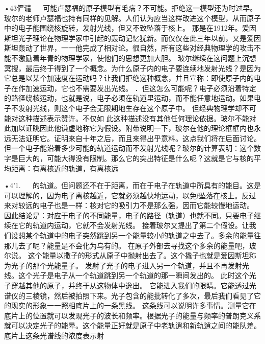 •43俨谴
  
可能卢瑟福的原子模型有毛病？不可能。拒绝这一模型还为时过早。玻尔的老师卢瑟福也持有同样的见解。人们认为应当这样改进这个模型，从而原子中的电子能围绕核旋转，发射光线，但又不致坠落于核上。
那是在1912年。爱因斯坦光子理论在物理学家中引起的轰动记忆犹新。而仅仅在此三年以前，又是爱因斯坦轰动了世界，一一他完成了相对论。很自然，所有这些对经典物理学的攻击不能不激励着年青的物理学家，使他们的思想更加大胆。
玻尔继续在这问题上沉想冥搜，最后终于得到了一个概念。为什么原子内的电子要连续地发射光线？是因为它总是以某个加速度在运动吗？让我们拒绝这种概念，并且宣称：即使原子内的电子在作加速运动，它也不需要发出光线。
．但这怎么可能呢？电子必须沿着特定的路径绕核运动，也就是说，电子必须在轨道里运动，而不能任意地运动。如果电子不发射光线，则这个电子会无限期地生存在这个原子中。
但经典物理学却不可能对这种描述表示赞许。不仅如
此这种描述没有其他任何理论依据。玻尔不能对此加以证眺因此他谦虚地称它为假设。附带说明一下，玻尔在他的理论框框内也永远无法证明它。证明来自十年之后，而且来得出乎意料。这点我们将在后面讨论。但一个电子能沿着多少可能的轨道运动而不发射光线呢？玻尔的计算表明：这个数字是巨大的，可能大得没有限制。那么它的突出特征是什么呢？这就是它与核的平均距离：有离核近的轨道，有离核远

•4'1.
  
的轨道。但问题还不在于距离，而在于电子在轨道中所具有的能目。这是可以理解的，因为电子离核越近，它就必须越快地运动，以免f坠落在核上。反过来对较远的电子也是一样：核对它的吸引力不是那么强，因而它能较慢地运动。
因此结论是：对应于电子的不同能量，电子的路径（轨道）也就不同。只要电子继续在它的轨道内运动，它就不会发射光线。
接着玻尔又提出了第二个假设。让我们设想某个轨道中的电子突然跳到另一个能量较小的轨道之中去了。多余的能量往那儿去了呢？能量是不会化为乌有的。
在原子外部去寻找这个多余的能量吧，玻尔说。
这个能量以撒子的形式从原子中抛射出去了。这个撬子也就是爱因斯坦称为光子的那个光能量子。
发射了光子的电子进入另一个轨道，并且不再发射光线。这个光子是电子从一个轨道跳到另一个轨道的那一瞬间发出的。
此时这个光子穿越其他的原子，并终于从这物体中逸出。
它能进入我们的限睛。它能透过光谱仪的三棱镜，然后被拍照下来。光子包含的能批转化了多次，最后我们看见了它的现实的形象一一照相底片上的一条黑线。
这条线可以说明许多事情。测量它在底片上的位置就可以发现光子的波长和频率。根据光子的能量与频率的普朗克义系就可以决定光子的能晕。这个能量正好就是原子中老轨逍和新轨逍之间的能队差。底片上这条光谱线的浓度表示射

